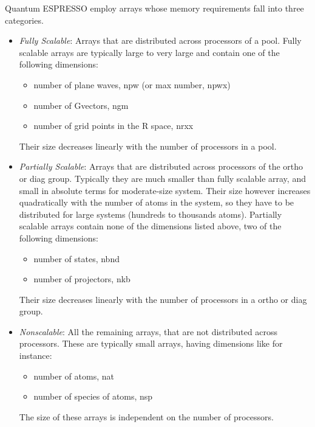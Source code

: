 \documentclass[12pt,a4paper]{article}
\begin{document}
Quantum ESPRESSO employ arrays whose memory requirements fall 
into three categories.
\begin{itemize}
\item {\em Fully Scalable}: 
Arrays that are distributed across processors of a pool.
Fully scalable arrays are typically large to very large and contain one 
of the following dimensions:
\begin{itemize}
\item number of plane waves, npw (or max number, npwx)
\item number of Gvectors, ngm
\item number of grid points in the R space, nrxx
\end{itemize}
Their size decreases linearly with the number of processors in a pool. 

\item {\em Partially Scalable}: 
Arrays that are distributed across processors of the
ortho or diag group. Typically they are much smaller than fully scalable
array, and small in absolute terms for moderate-size system. Their size
however increases quadratically with the number of atoms in the system,
so they have to be distributed for large systems (hundreds to thousands
atoms). Partially scalable arrays contain none of the dimensions listed 
above, two of the following dimensions:
\begin{itemize}
\item number of states, nbnd
\item number of projectors, nkb
\end{itemize}
Their size decreases linearly with the number of processors in a ortho
or diag group. 

\item
{\em Nonscalable}: All the remaining arrays, that are not distributed across
processors. These are typically small arrays, having dimensions like for
instance:
\begin{itemize}
\item number of atoms, nat
\item number of species of atoms, nsp
\end{itemize}
The size of these arrays is independent on the number of processors.
\end{itemize}

\end{document}
